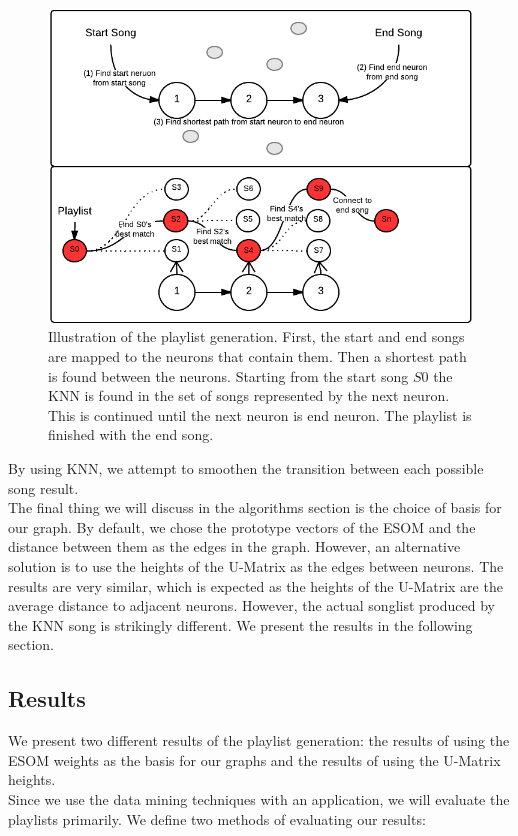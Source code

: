 \begin{figure}[htb!]
	\centering
	\includegraphics[width=\textwidth]{figures/playlist-generation}
	\caption{Illustration of the playlist generation. First, the start and end songs are mapped to the neurons that contain them. Then a shortest path is found between the neurons. Starting from the start song \(S0\) the KNN is found in the set of songs represented by the next neuron. This is continued until the next neuron is end neuron. The playlist is finished with the end song.}
\end{figure}

By using KNN, we attempt to smoothen the transition between each possible song result. \\
The final thing we will discuss in the algorithms section is the choice of basis for our graph. By default, we chose 
the prototype vectors of the ESOM and the distance between them as the edges in the graph. However, an alternative solution is to use the heights of the U-Matrix as the edges between neurons. The results are very similar, which is expected as the heights of the U-Matrix are the average distance to adjacent neurons. However, the actual songlist produced by the KNN song is strikingly different. We present the results in the following section.

\subsection{Results}

We present two different results of the playlist generation: the results of using the ESOM weights as the basis for our graphs and the results of using the U-Matrix heights.\\
Since we use the data mining techniques with an application, we will evaluate the playlists primarily. We define two methods of evaluating our results:

